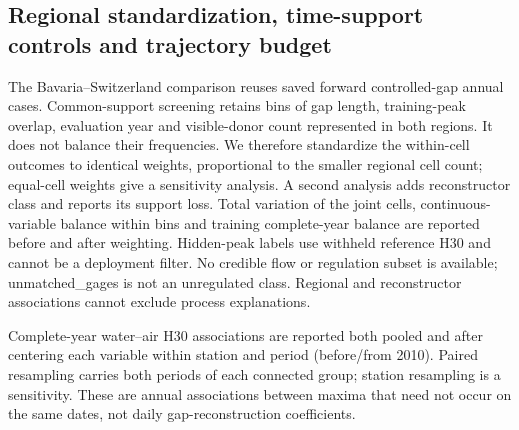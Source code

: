 \documentclass[draft,linenumbers]{agujournal2025}
\begin{document}
\subsection{Regional standardization, time-support controls and trajectory budget}
The Bavaria--Switzerland comparison reuses saved forward controlled-gap annual cases. Common-support screening retains bins of gap length, training-peak overlap, evaluation year and visible-donor count represented in both regions. It does not balance their frequencies. We therefore standardize the within-cell outcomes to identical weights, proportional to the smaller regional cell count; equal-cell weights give a sensitivity analysis. A second analysis adds reconstructor class and reports its support loss. Total variation of the joint cells, continuous-variable balance within bins and training complete-year balance are reported before and after weighting. Hidden-peak labels use withheld reference H30 and cannot be a deployment filter. No credible flow or regulation subset is available; unmatched\_gages is not an unregulated class. Regional and reconstructor associations cannot exclude process explanations.

Complete-year water--air H30 associations are reported both pooled and after centering each variable within station and period (before/from 2010). Paired resampling carries both periods of each connected group; station resampling is a sensitivity. These are annual associations between maxima that need not occur on the same dates, not daily gap-reconstruction coefficients.
\end{document}
